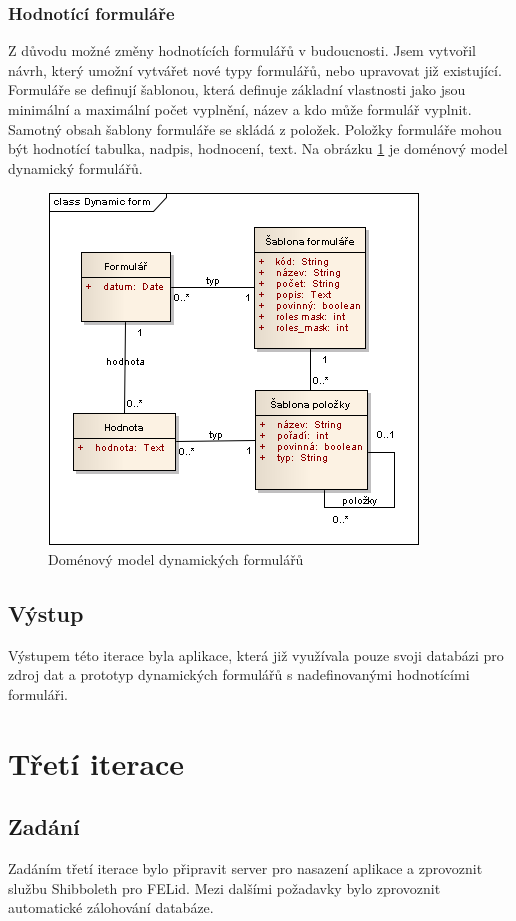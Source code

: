 \subsubsection{Hodnotící formuláře}
Z důvodu možné změny hodnotících formulářů v budoucnosti. Jsem vytvořil návrh, který umožní vytvářet nové typy formulářů, nebo upravovat již existující. Formuláře se definují šablonou, která definuje základní vlastnosti jako jsou minimální a maximální počet vyplnění, název a kdo může formulář vyplnit. Samotný obsah šablony formuláře se skládá z položek. Položky formuláře mohou být hodnotící tabulka, nadpis, hodnocení, text. Na obrázku \ref{fig:dynamicform} je doménový model dynamický formulářů.

\begin{figure}[h]
\begin{center}
\includegraphics[scale=0.7]{figures/Dynamic_form}
\caption{Doménový model dynamických formulářů}
\label{fig:dynamicform}
\end{center}
\end{figure}

\subsection{Výstup} 
Výstupem této iterace byla aplikace, která již využívala pouze svoji databázi pro zdroj dat a prototyp dynamických formulářů s nadefinovanými hodnotícími formuláři.

\section{Třetí iterace}
\subsection{Zadání}
Zadáním třetí iterace bylo připravit server pro nasazení aplikace a zprovoznit službu Shibboleth pro FELid.
Mezi dalšími požadavky bylo zprovoznit automatické zálohování databáze.


